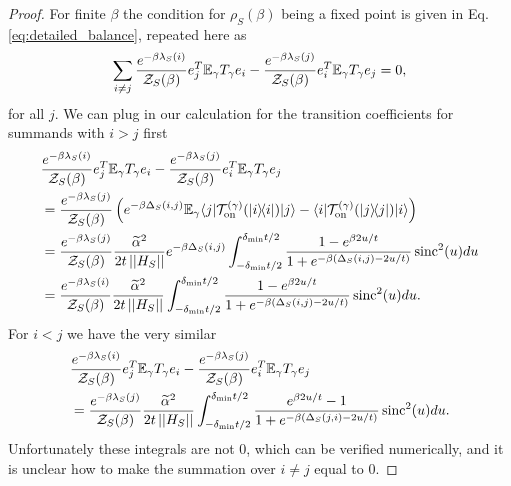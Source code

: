 \begin{proof}
    For finite $\beta$ the condition for $\rho_S(\beta)$ being a fixed point is given in Eq. \eqref{eq:detailed_balance}, repeated here as
    \begin{equation}
        \sum_{i \neq j} \frac{e^{-\beta \lambda_S(i)}}{\mathcal{Z}_S(\beta)} e_j^T \mathbb{E}_\gamma T_\gamma e_i - \frac{e^{-\beta \lambda_S(j)}}{\mathcal{Z}_S(\beta)}  e_i^T \mathbb{E}_\gamma T_\gamma e_j = 0,
    \end{equation}
    for all $j$. We can plug in our calculation for the transition coefficients for summands with $i > j$ first
    \begin{align}
        &\frac{e^{-\beta \lambda_S(i)}}{\mathcal{Z}_S(\beta)} e_j^T \mathbb{E}_\gamma T_\gamma e_i - \frac{e^{-\beta \lambda_S(j)}}{\mathcal{Z}_S(\beta)}  e_i^T \mathbb{E}_\gamma T_\gamma e_j \nonumber \\ 
        &= \frac{e^{-\beta \lambda_S(j)}}{\mathcal{Z}_S(\beta)} \left( e^{-\beta \Delta_S(i,j)} \mathbb{E}_\gamma \langle j| \mathcal{T}_{\rm on}^{(\gamma)}(| i\rangle\! \langle i|)|j\rangle - \langle i| \mathcal{T}_{\rm on}^{(\gamma)}(| j\rangle\! \langle j|)|i\rangle \right) \\
        &= \frac{e^{-\beta \lambda_S(j)}}{\mathcal{Z}_S(\beta)} \frac{\widetilde{\alpha}^2}{2 t \left| \left| H_S \right| \right|} e^{-\beta \Delta_S(i,j)} \int_{-\delta_{\min} t /2 }^{\delta_{\min} t/ 2} \frac{1 - e^{\beta 2 u / t}}{1 + e^{-\beta(\Delta_S(i,j) - 2u/t)}} \operatorname{sinc}^2(u) du \\
        &= \frac{e^{-\beta \lambda_S(i)}}{\mathcal{Z}_S(\beta)} \frac{\widetilde{\alpha}^2}{2 t \left| \left| H_S \right| \right|} \int_{-\delta_{\min} t /2 }^{\delta_{\min} t/ 2} \frac{1 - e^{\beta 2 u / t}}{1 + e^{-\beta(\Delta_S(i,j) - 2u/t)}} \operatorname{sinc}^2(u) du. \label{eq:zero_knowledge_tmp_1}
    \end{align}
    For $i < j$ we have the very similar
    \begin{align}
        &\frac{e^{-\beta \lambda_S(i)}}{\mathcal{Z}_S(\beta)} e_j^T \mathbb{E}_\gamma T_\gamma e_i - \frac{e^{-\beta \lambda_S(j)}}{\mathcal{Z}_S(\beta)}  e_i^T \mathbb{E}_\gamma T_\gamma e_j \nonumber \\ 
        &= \frac{e^{-\beta \lambda_S(j)}}{\mathcal{Z}_S(\beta)} \frac{\widetilde{\alpha}^2}{2 t \left| \left| H_S \right| \right|} \int_{-\delta_{\min} t /2 }^{\delta_{\min} t/ 2} \frac{ e^{\beta 2 u / t} - 1}{1 + e^{-\beta(\Delta_S(j, i) - 2u/t)}} \operatorname{sinc}^2(u) du. \label{eq:zero_knowledge_tmp_2}
    \end{align}
    Unfortunately these integrals are not 0, which can be verified numerically, and it is unclear how to make the summation over $i \neq j$ equal to 0. 
    

\end{proof}
